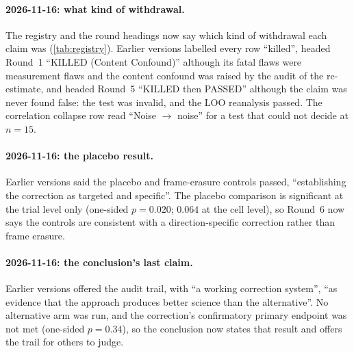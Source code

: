 \documentclass[11pt,letterpaper]{article}
\begin{document}
\paragraph{2026-11-16: what kind of withdrawal.} The registry and the round headings now say which
kind of withdrawal each claim was (\cref{tab:registry}). Earlier versions labelled every row ``killed'',
headed Round~1 ``KILLED (Content Confound)'' although its fatal flaws were measurement flaws and the
content confound was raised by the audit of the re-estimate, and headed Round~5 ``KILLED then PASSED''
although the claim was never found false: the test was invalid, and the LOO reanalysis passed. The
correlation collapse row read ``Noise $\to$ noise'' for a test that could not decide at $n=15$.

\paragraph{2026-11-16: the placebo result.} Earlier versions said the placebo and frame-erasure
controls passed, ``establishing the correction as targeted and specific''. The placebo comparison is
significant at the trial level only (one-sided $p=0.020$; $0.064$ at the cell level), so Round~6 now
says the controls are consistent with a direction-specific correction rather than frame erasure.

\paragraph{2026-11-16: the conclusion's last claim.} Earlier versions offered the audit trail, with ``a
working correction system'', ``as evidence that the approach produces better science than the
alternative''. No alternative arm was run, and the correction's confirmatory primary endpoint was not
met (one-sided $p=0.34$), so the conclusion now states that result and offers the trail for others to
judge.


\end{document}
